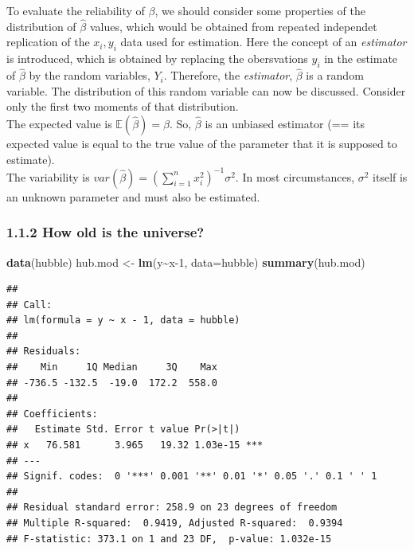 \documentclass[
]{article}
\newenvironment{Shaded}{\begin{snugshade}}{\end{snugshade}}
\newcommand{\DataTypeTok}[1]{\textcolor[rgb]{0.13,0.29,0.53}{#1}}
\newcommand{\DecValTok}[1]{\textcolor[rgb]{0.00,0.00,0.81}{#1}}
\newcommand{\KeywordTok}[1]{\textcolor[rgb]{0.13,0.29,0.53}{\textbf{#1}}}
\newcommand{\NormalTok}[1]{#1}
\newcommand{\OperatorTok}[1]{\textcolor[rgb]{0.81,0.36,0.00}{\textbf{#1}}}
\newcommand{\StringTok}[1]{\textcolor[rgb]{0.31,0.60,0.02}{#1}}
\begin{document}
To evaluate the reliability of \(\beta\), we should consider some
properties of the distribution of \(\hat \beta\) values, which would be
obtained from repeated independet replication of the \(x_i, y_i\) data
used for estimation. Here the concept of an \emph{estimator} is
introduced, which is obtained by replacing the obersvations \(y_i\) in
the estimate of \(\hat \beta\) by the random variables, \(Y_i\).
Therefore, the \emph{estimator}, \(\hat \beta\) is a random variable.
The distribution of this random variable can now be discussed. Consider
only the first two moments of that distribution.\\
The expected value is \(\mathbb{E}(\hat \beta) = \beta\). So,
\(\hat \beta\) is an unbiased estimator (== its expected value is equal
to the true value of the parameter that it is supposed to estimate).\\
The variability is
\(var(\hat \beta) = (\sum_{i=1}^n x_i^2)^{-1} \sigma^2\). In most
circumstances, \(\sigma^2\) itself is an unknown parameter and must also
be estimated.

\hypertarget{how-old-is-the-universe}{%
\subsubsection{1.1.2 How old is the
universe?}\label{how-old-is-the-universe}}

\begin{Shaded}
\begin{Highlighting}[]
\KeywordTok{data}\NormalTok{(hubble)}
\NormalTok{hub.mod \textless{}{-}}\StringTok{ }\KeywordTok{lm}\NormalTok{(y}\OperatorTok{\textasciitilde{}}\NormalTok{x}\DecValTok{{-}1}\NormalTok{, }\DataTypeTok{data=}\NormalTok{hubble)}
\KeywordTok{summary}\NormalTok{(hub.mod)}
\end{Highlighting}
\end{Shaded}

\begin{verbatim}
## 
## Call:
## lm(formula = y ~ x - 1, data = hubble)
## 
## Residuals:
##    Min     1Q Median     3Q    Max 
## -736.5 -132.5  -19.0  172.2  558.0 
## 
## Coefficients:
##   Estimate Std. Error t value Pr(>|t|)    
## x   76.581      3.965   19.32 1.03e-15 ***
## ---
## Signif. codes:  0 '***' 0.001 '**' 0.01 '*' 0.05 '.' 0.1 ' ' 1
## 
## Residual standard error: 258.9 on 23 degrees of freedom
## Multiple R-squared:  0.9419, Adjusted R-squared:  0.9394 
## F-statistic: 373.1 on 1 and 23 DF,  p-value: 1.032e-15
\end{verbatim}
\end{document}
